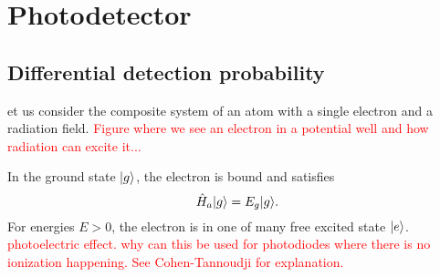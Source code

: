 \section{Photodetector}

\subsection{Differential detection probability}

et us consider the composite system of an atom with a single electron and a radiation field.
\textcolor{red}{Figure where we see an electron in a potential well and how radiation can excite it...}

In the ground state $\lvert g\rangle$, the electron is bound and satisfies
\begin{equation}
	\hat{H}_a
	\lvert g\rangle
	=
	E_g
	\lvert g\rangle
	.
\end{equation}
For energies $E>0$, the electron is in one of many free excited state $\lvert e\rangle$.
\textcolor{red}{photoelectric effect. why can this be used for photodiodes where there is no ionization happening. See Cohen-Tannoudji for explanation.}

